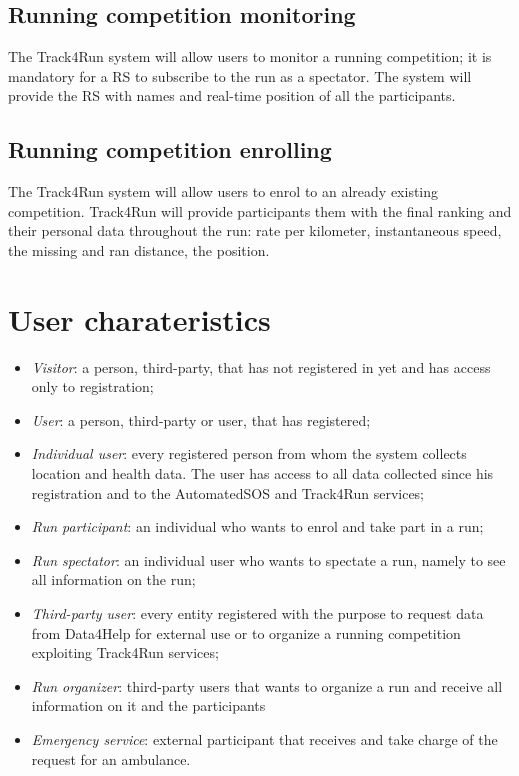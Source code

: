 \subsection{Running competition monitoring}
The Track4Run system will allow users to monitor a running competition; it is mandatory for a RS to subscribe to the run as a spectator. The system will provide the RS with names and real-time position of all the participants.
\subsection{Running competition enrolling}
The Track4Run system will allow users to enrol to an already existing competition. Track4Run will provide participants them with the final ranking and their personal data throughout the run: rate per kilometer, instantaneous speed, the missing and ran distance, the position.

\section{User charateristics}
\begin{itemize}
\item	\textit{Visitor}: a person, third-party, that has not registered in yet and has access only to registration;
\item	\textit{User}:  a person, third-party or user, that has registered;
\item	\textit{Individual user}: every registered person from whom the system collects location and health data. The user has access to all data collected since his registration and to the AutomatedSOS and Track4Run services;
\item	\textit{Run participant}: an individual who wants to enrol and take part in a run;
\item	\textit{Run spectator}: an individual user who wants to spectate a run, namely to see all information on the run;
\item \textit{Third-party user}: every entity registered with the purpose to request data from Data4Help for external use or to organize a running competition exploiting Track4Run services;
\item	\textit{Run organizer}: third-party users that wants to organize a run and receive all information on it and the participants
\item	\textit{Emergency service}: external participant that receives and take charge of the request for an ambulance.
\end{itemize}

